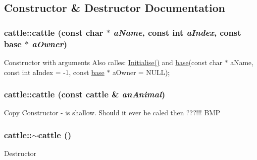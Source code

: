 \subsection{Constructor \& Destructor Documentation}
\hypertarget{classcattle_adf9d179e58cd2a02b9b5e0f8a1668bb9}{
\subsubsection[{cattle}]{\setlength{\rightskip}{0pt plus 5cm}cattle::cattle (const char $\ast$ {\em aName}, \/  const int {\em aIndex}, \/  const {\bf base} $\ast$ {\em aOwner})}}
\label{classcattle_adf9d179e58cd2a02b9b5e0f8a1668bb9}
Constructor with arguments Also calles: \hyperlink{classcattle_a7a2111adbacdb6ec477005ac5779077b}{Initialise()} and \hyperlink{classbase}{base}(const char $\ast$ aName, const int aIndex = -\/1, const \hyperlink{classbase}{base} $\ast$ aOwner = NULL); \hypertarget{classcattle_a1588b725bd7fe6e3fe250007ebfc0785}{
\subsubsection[{cattle}]{\setlength{\rightskip}{0pt plus 5cm}cattle::cattle (const {\bf cattle} \& {\em anAnimal})}}
\label{classcattle_a1588b725bd7fe6e3fe250007ebfc0785}
Copy Constructor -\/ is shallow. Should it ever be caled then ???!!! BMP \hypertarget{classcattle_ab9a244e71daafd2dec8ecaf18aa0c081}{
\subsubsection[{$\sim$cattle}]{\setlength{\rightskip}{0pt plus 5cm}cattle::$\sim$cattle ()}}
\label{classcattle_ab9a244e71daafd2dec8ecaf18aa0c081}
Destructor 

